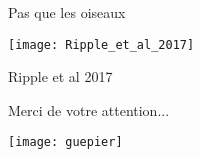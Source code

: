 \documentclass[10pt]{beamer}
\begin{document}
\begin{frame}{Pas que les oiseaux}
\begin{center}
\texttt{[image: Ripple\_et\_al\_2017]}
\end{center}
\begin{tiny}
 Ripple et al 2017
\end{tiny}

\end{frame}



\begin{frame}[plain]
\begin{center}
\begin{huge}
 Merci de votre attention...
\end{huge}
\texttt{[image: guepier]}
\end{center}
 \end{frame}
\end{document}
